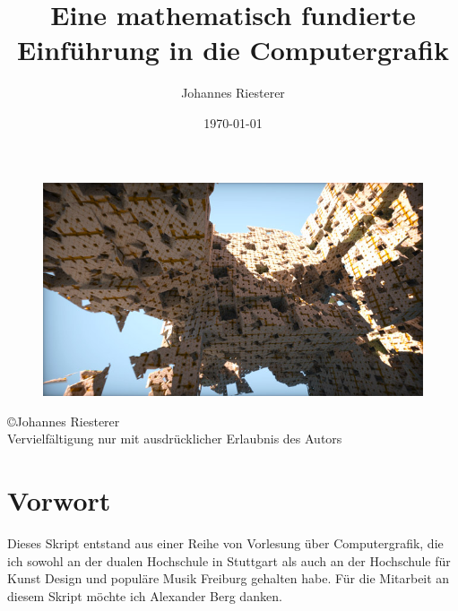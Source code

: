 \title{Eine mathematisch fundierte Einführung in die Computergrafik}
\author{Johannes Riesterer}
\date{\today}
\maketitle\thispagestyle{empty}
 \begin{figure}[H]
    \centering
    \includegraphics[width=1.0\textwidth]{images/cover.jpg}
    \label{fig:diffus}
\end{figure}
\newpage 
\begin{center}
\large
 \copyright Johannes Riesterer \\
Vervielfältigung nur mit ausdrücklicher Erlaubnis des Autors
\end{center}
\thispagestyle{empty}
\newpage

\section*{Vorwort}
\mbox{}\thispagestyle{empty}

Dieses Skript entstand aus einer Reihe von Vorlesung über Computergrafik, die ich sowohl an der dualen Hochschule in Stuttgart als auch an der Hochschule für 
Kunst Design und populäre Musik Freiburg gehalten habe. Für die Mitarbeit an diesem Skript möchte ich Alexander Berg  danken.



\newpage
